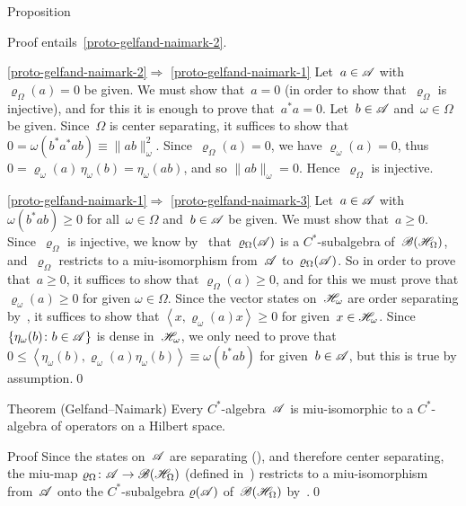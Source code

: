 \documentclass[a]{subfiles}
\begin{document}
\begin{parsec}
\begin{point}{Proposition}
\begin{point}{Proof}
entails~\ref{proto-gelfand-naimark-2}.
\begin{point}{\ref{proto-gelfand-naimark-2}$\Longrightarrow$%
\ref{proto-gelfand-naimark-1}}%
Let~$a\in \mathscr{A}$ with $\varrho_\Omega(a)=0$ be given.
We must show that~$a=0$ (in order to show that~$\varrho_\Omega$
is injective),
and for this it is enough to prove that~$a^*a=0$.
Let~$b\in\mathscr{A}$ and~$\omega\in\Omega$ be given.
Since~$\Omega$ is center separating,
it suffices to show that $0=\omega(b^*a^*ab) \equiv \|ab\|_\omega^2$.
Since~$\varrho_\Omega(a)=0$,
we have $\varrho_\omega(a)=0$,
thus $0=\varrho_\omega(a)\,\eta_\omega(b)
=\eta_\omega(ab)$,
and so $\|ab\|_\omega=0$.
Hence~$\varrho_\Omega$ is injective.
\end{point}
\begin{point}{\ref{proto-gelfand-naimark-1}$\Longrightarrow$%
\ref{proto-gelfand-naimark-3}}%
Let~$a\in\mathscr{A}$ with $\omega(b^*a b)\geq 0$
for all~$\omega\in\Omega$ and~$b\in\mathscr{A}$
be given.
We must show that~$a\geq 0$.
Since~$\varrho_\Omega$ is injective,
we know by~
that~$\varrho_\Omega(\mathscr{A})$ is a $C^*$-subalgebra
of~$\mathscr{B}(\mathscr{H}_\Omega)$,
and~$\varrho_\Omega$ restricts to a miu-isomorphism
from~$\mathscr{A}$ to~$\varrho_\Omega(\mathscr{A})$.
So in order to prove that~$a\geq 0$,
it suffices to show that $\varrho_\Omega(a)\geq 0$,
and for this we must prove that $\varrho_\omega(a)\geq 0$
for given $\omega\in \Omega$.
Since the vector states on~$\mathscr{H}_\omega$ are order separating
by~, it suffices to show that 
$\left<x,\varrho_\omega(a)x\right>\geq 0$
for given~$x\in \mathscr{H}_\omega$.
Since~$\{\eta_\omega(b)\colon b\in\mathscr{A}\}$
is dense in~$\mathscr{H}_\omega$,
we only need to prove 
that~$0\leq \left<\eta_\omega(b),\varrho_\omega(a)\eta_\omega(b)\right>
\equiv \omega(b^*ab)$ for given~$b\in \mathscr{A}$,
but this is true
by assumption.\qed
\end{point}
\end{point}
\end{point}
\begin{point}{Theorem (Gelfand--Naimark)}%
Every $C^*$-algebra~$\mathscr{A}$ is miu-isomorphic
to a $C^*$-algebra of operators on a Hilbert space.
\begin{point}{Proof}%
Since the states on~$\mathscr{A}$
are separating
(),
and therefore center separating,
the miu-map $\varrho_\Omega\colon \mathscr{A}\to\mathscr{B}(\mathscr{H}_\Omega)$
(defined in~)
restricts to a miu-isomorphism
from~$\mathscr{A}$ onto the $C^*$-subalgebra
$\varrho(\mathscr{A})$ of~$\mathscr{B}(\mathscr{H}_\Omega)$
by~.\qed
\end{point}
\end{point}
\end{parsec}
\end{document}
